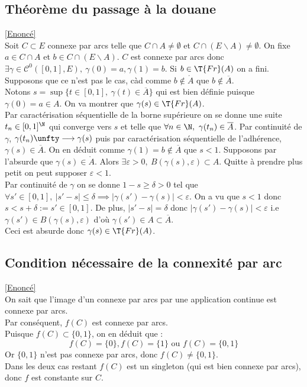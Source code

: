 \documentclass{book}
\begin{document}
	\subsection{Théorème du passage à la douane }
	\label{sec:theoreme-du-passage-a-la-douane}
	\textcolor{blue}{\hyperref[Théorème du passage à la douane]{[Enoncé]}}\\
	Soit $C\subset E$ connexe par arcs telle que $C\cap A\ne\emptyset$ et $C\cap(E\backslash A)\ne\emptyset$. On fixe $a\in C\cap A$ et $b\in C\cap(E\backslash A)$. $C$ est connexe par arcs donc $\exists \gamma\in \mathcal C^0([0,1],E),\ \gamma(0)=a,\gamma(1)=b$. Si $b\in \T{Fr}(A)$ on a fini. Supposons que ce n'est pas le cas, càd comme $b\notin \ring A$ que $b\notin \overline A$.\\
	Notons $s=\sup\{t\in [0,1],\ \gamma(t)\in \overline A\}$ qui est bien définie puisque $\gamma(0)=a\in A$. On va montrer que $\gamma(s)\in \T{Fr}(A)$.\\
	Par caractérisation séquentielle de la borne supérieure on se donne une suite $t_n\in [0,1]^\N$ qui converge vers $s$ et telle que $\forall n\in \N,\ \gamma(t_n)\in \overline A$. Par continuité de $\gamma$, $\gamma(t_n)\unfty\longrightarrow\gamma(s)$ puis par caractérisation séquentielle de l'adhérence, $\gamma(s)\in \overline A$. On en déduit comme $\gamma(1)=b\notin \overline A$ que $s<1$. Supposons par l'absurde que $\gamma(s)\in \ring A$. Alors $\exists \varepsilon>0,\ B(\gamma(s),\varepsilon)\subset A$. Quitte à prendre plus petit on peut supposer $\varepsilon<1$.\\
	Par continuité de $\gamma$ on se donne $1-s\geq \delta>0$ tel que $\forall s'\in [0,1],\ |s'-s|\leq \delta\implies |\gamma(s')-\gamma(s)|<\varepsilon$. On a vu que $s<1$ donc $s<s+\delta:=s'\in [0,1]$. De plus, $|s'-s|=\delta$ donc $|\gamma(s')-\gamma(s)|<\varepsilon$ i.e $\gamma(s')\in B(\gamma(s),\varepsilon)$ d'où $\gamma(s')\in A\subset \overline A$.\\
	Ceci est absurde donc $\gamma(s)\in \T{Fr}(A)$.
	
	\subsection{Condition nécessaire de la connexité par arc }
	\label{sec:condition-necessaire-de-la-connexite-par-arc}
	\textcolor{blue}{\hyperref[Condition nécessaire de la connexité par arc]{[Enoncé]}}\\
	On sait que l'image d'un connexe par arcs par une application continue est connexe par arcs.\\
	Par conséquent, $f(C)$ est connexe par arcs.\\
	Puisque $f(C)\subset\{0,1\}$, on en déduit que : \[f(C)=\{0\}, f(C)=\{1\} \text{ ou } f(C)=\{0,1\}\]
	Or $\{0,1\}$ n'est pas connexe par arcs, donc $f(C)\ne\{0,1\}$.\\
	Dans les deux cas restant $f(C)$ est un singleton (qui est bien connexe par arcs), donc $f$ est constante sur $C$.
	
\end{document}

